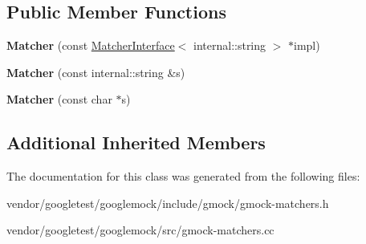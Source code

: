 \subsection*{Public Member Functions}
\begin{DoxyCompactItemize}
\item 
\mbox{\label{classtesting_1_1_matcher_3_01internal_1_1string_01_4_a03a7b1b4a93b762685e2f46d6255d493}} 
{\bfseries Matcher} (const \hyperlink{classtesting_1_1_matcher_interface}{Matcher\+Interface}$<$ internal\+::string $>$ $\ast$impl)
\item 
\mbox{\label{classtesting_1_1_matcher_3_01internal_1_1string_01_4_ae2d21038e4dcc25776187d8bff1665f3}} 
{\bfseries Matcher} (const internal\+::string \&s)
\item 
\mbox{\label{classtesting_1_1_matcher_3_01internal_1_1string_01_4_a65f1d7616edb049ac059ad5d3fa2d625}} 
{\bfseries Matcher} (const char $\ast$s)
\end{DoxyCompactItemize}
\subsection*{Additional Inherited Members}


The documentation for this class was generated from the following files\+:\begin{DoxyCompactItemize}
\item 
vendor/googletest/googlemock/include/gmock/gmock-\/matchers.\+h\item 
vendor/googletest/googlemock/src/gmock-\/matchers.\+cc\end{DoxyCompactItemize}
